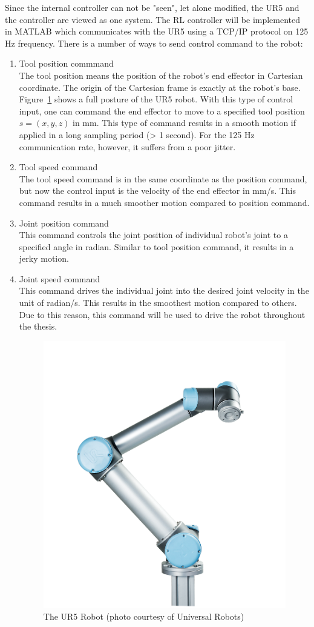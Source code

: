 Since the internal controller can not be "seen", let alone modified, the UR5 and the controller are viewed as one system. The \ac {RL} controller will be implemented in MATLAB which communicates with the UR5 using a TCP/IP protocol on 125 Hz frequency. There is a number of ways to send control command to the robot:
\begin{enumerate}
\item Tool position commmand \\
The tool position means the position of the robot's end effector in Cartesian coordinate. The origin of the Cartesian frame is exactly at the robot's base. Figure~\ref{fig:UR5_Robot01} shows a full posture of the UR5 robot. With this type of control input, one can command the end effector to move to a specified tool position $ s = (x, y, z) $ in mm. This type of command results in a smooth motion if applied in a long sampling period (> 1 second). For the 125 Hz communication rate, however, it suffers from a poor jitter.

\item Tool speed command \\
The tool speed command is in the same coordinate as the position command, but now the control input is the velocity of the end effector in mm/s. This command results in a much smoother motion compared to position command.

\item Joint position command \\
This command controls the joint position of individual robot's joint to a specified angle in radian. Similar to tool position command, it results in a jerky motion. 

\item Joint speed command \\
This command drives the individual joint into the desired joint velocity in the unit of radian/s. This results in the smoothest motion compared to others. Due to this reason, this command will be used to drive the robot throughout the thesis.

\begin{figure}
\centering
\includegraphics[width=0.5\linewidth]{UR5_Robot01}
\caption{The UR5 Robot (photo courtesy of Universal Robots)}
\label{fig:UR5_Robot01}
\end{figure}
 
\end{enumerate}

